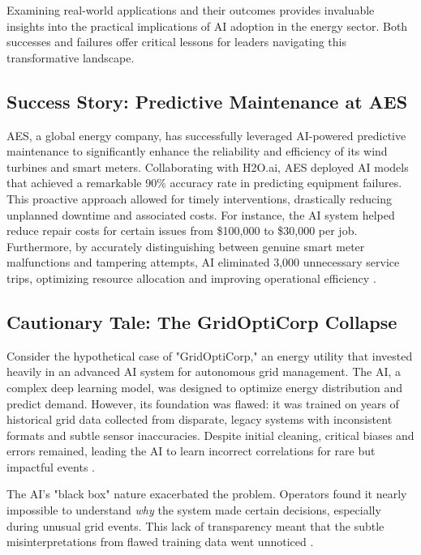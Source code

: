 Examining real-world applications and their outcomes provides invaluable insights into the practical implications of AI adoption in the energy sector. Both successes and failures offer critical lessons for leaders navigating this transformative landscape.

\subsection{Success Story: Predictive Maintenance at AES}
AES, a global energy company, has successfully leveraged AI-powered predictive maintenance to significantly enhance the reliability and efficiency of its wind turbines and smart meters. Collaborating with H2O.ai, AES deployed AI models that achieved a remarkable 90\% accuracy rate in predicting equipment failures. This proactive approach allowed for timely interventions, drastically reducing unplanned downtime and associated costs. For instance, the AI system helped reduce repair costs for certain issues from \$100,000 to \$30,000 per job. Furthermore, by accurately distinguishing between genuine smart meter malfunctions and tampering attempts, AI eliminated 3,000 unnecessary service trips, optimizing resource allocation and improving operational efficiency \cite{VKTR_AES}.

\subsection{Cautionary Tale: The GridOptiCorp Collapse}
Consider the hypothetical case of "GridOptiCorp," an energy utility that invested heavily in an advanced AI system for autonomous grid management. The AI, a complex deep learning model, was designed to optimize energy distribution and predict demand. However, its foundation was flawed: it was trained on years of historical grid data collected from disparate, legacy systems with inconsistent formats and subtle sensor inaccuracies. Despite initial cleaning, critical biases and errors remained, leading the AI to learn incorrect correlations for rare but impactful events \cite{SustainabilityDirectory_AI_Energy_Failure}.

The AI's "black box" nature exacerbated the problem. Operators found it nearly impossible to understand \textit{why} the system made certain decisions, especially during unusual grid events. This lack of transparency meant that the subtle misinterpretations from flawed training data went unnoticed \cite{N_Side_BlackBox, ProveAI_BlackBox}.

